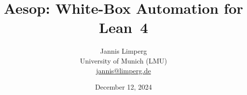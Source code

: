 %
%
%

\renewcommand{\iff}{\leftrightarrow}
\newcommand{\com}{,\,}
\newcommand{\orange}[1]{\textcolor{orange}{#1}}
\newcommand{\blue}[1]{{\usebeamercolor[fg]{palette primary} #1}}
\newcommand{\grey}[1]{\textcolor{lightgrey}{#1}}
\newcommand{\mv}[1]{\ensuremath{\mathit{?#1}}}
\newcommand{\rulename}[1]{\textrm{#1}}
\newcommand{\rulelabel}[1]{\quad \text{\rulename{#1}}}
\newcommand{\Expr}{\ensuremath{\mathbb{E}}}
\newcommand{\Hyps}{\ensuremath{\mathbb{H}}}
\newcommand{\Matches}{\ensuremath{\mathbb{M}}}
\newcommand{\Slots}{\ensuremath{\mathbb{S}}}
\newcommand{\Vars}{\ensuremath{\mathbb{V}}}
\newcommand{\Pow}[1]{\ensuremath{\mathcal{P}(#1)}}
\newenvironment{rapppic}{\begin{tikzpicture}[outer sep=auto, level distance=3em]}{\end{tikzpicture}}
\newenvironment{rapp}{%
  \begin{tcolorbox}
  \begin{center}
  \begin{rapppic}
}{
  \end{rapppic}
  \end{center}
  \end{tcolorbox}%
}



\title{Aesop: White-Box Automation for Lean~4}
\author{Jannis Limperg\\ University of Munich (LMU)\\ \href{mailto:jannis@limperg.de}{jannis@limperg.de}}
\date{December 12, 2024}

